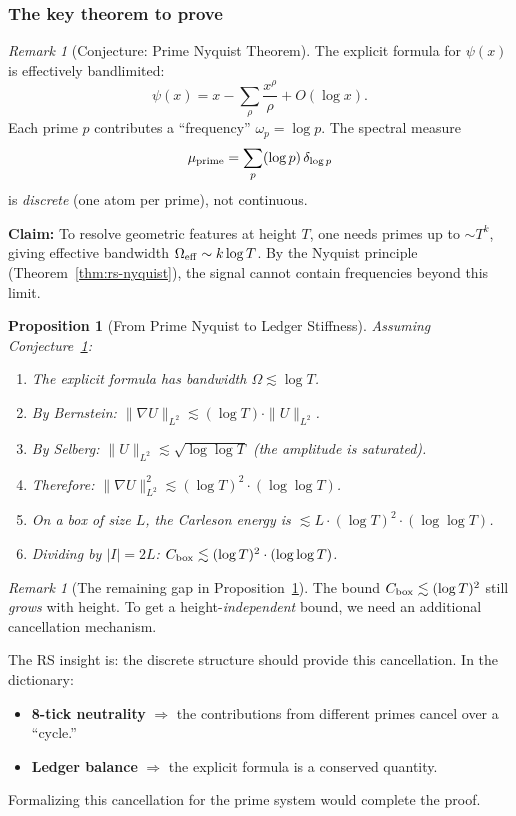 \documentclass[11pt]{article}
\newtheorem{proposition}[theorem]{Proposition}
\theoremstyle{definition}
\theoremstyle{remark}
\newtheorem{remark}[theorem]{Remark}
\theoremstyle{definition}
\begin{document}
\subsubsection*{The key theorem to prove}

\begin{remark}[Conjecture: Prime Nyquist Theorem]\label{conj:prime-nyquist}
The explicit formula for $\psi(x)$ is effectively bandlimited:
\[
  \psi(x) = x - \sum_\rho \frac{x^\rho}{\rho} + O(\log x).
\]
Each prime $p$ contributes a ``frequency'' $\omega_p = \log p$. The spectral measure
\[
  \mu_{\rm prime} = \sum_p (\log p)\,\delta_{\log p}
\]
is \emph{discrete} (one atom per prime), not continuous.

\textbf{Claim:} To resolve geometric features at height $T$, one needs primes up to $\sim T^k$, giving effective bandwidth $\Omega_{\rm eff} \sim k\log T$. By the Nyquist principle (Theorem~\ref{thm:rs-nyquist}), the signal cannot contain frequencies beyond this limit.
\end{remark}

\begin{proposition}[From Prime Nyquist to Ledger Stiffness]\label{prop:nyquist-to-ls}
Assuming Conjecture~\ref{conj:prime-nyquist}:
\begin{enumerate}
\item The explicit formula has bandwidth $\Omega \lesssim \log T$.
\item By Bernstein: $\|\nabla U\|_{L^2} \lesssim (\log T) \cdot \|U\|_{L^2}$.
\item By Selberg: $\|U\|_{L^2} \lesssim \sqrt{\log\log T}$ (the amplitude is saturated).
\item Therefore: $\|\nabla U\|_{L^2}^2 \lesssim (\log T)^2 \cdot (\log\log T)$.
\item On a box of size $L$, the Carleson energy is $\lesssim L \cdot (\log T)^2 \cdot (\log\log T)$.
\item Dividing by $|I| = 2L$: $C_{\rm box} \lesssim (\log T)^2 \cdot (\log\log T)$.
\end{enumerate}
\end{proposition}

\begin{remark}[The remaining gap in Proposition~\ref{prop:nyquist-to-ls}]
The bound $C_{\rm box} \lesssim (\log T)^2$ still \emph{grows} with height. To get a height-\emph{independent} bound, we need an additional cancellation mechanism.

The RS insight is: the discrete structure should provide this cancellation. In the dictionary:
\begin{itemize}
\item \textbf{8-tick neutrality} $\Rightarrow$ the contributions from different primes cancel over a ``cycle.''
\item \textbf{Ledger balance} $\Rightarrow$ the explicit formula is a conserved quantity.
\end{itemize}

Formalizing this cancellation for the prime system would complete the proof.
\end{remark}
\end{document}

